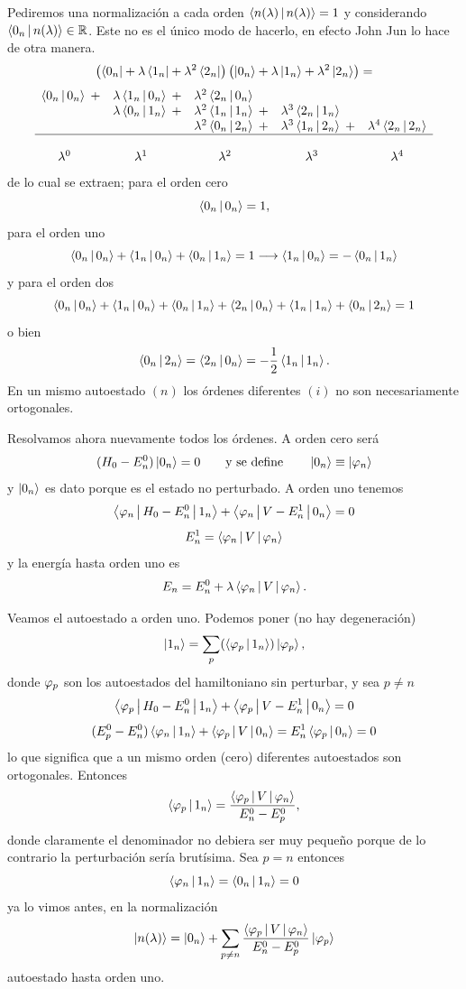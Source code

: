 \documentclass[10pt,oneside]{CBFT_book}
\begin{document}
Pediremos una normalización a cada orden $\Braket{n(\lambda)|n(\lambda)}=1$ y considerando 
$\Braket{0_n|n(\lambda)} \in \mathbb{R}$.
Este no es el único modo de hacerlo, en efecto John Jun lo hace de otra manera.
\[
	\left( \Bra{0_n} + \lambda\Bra{1_n} + \lambda^2\Bra{2_n} \right)
	\left( \Ket{0_n} + \lambda\Ket{1_n} + \lambda^2\Ket{2_n} \right) =
\]
\[
\begin{array}{ccccc}
 	\Braket{0_n|0_n}\; +& \lambda\Braket{1_n|0_n}\; +& \lambda^2 \Braket{2_n|0_n}\; \phantom{+}& \phantom{+}& \\
	\; & \lambda\Braket{0_n|1_n}\; +& \lambda^2\Braket{1_n|1_n}\; +& \lambda^3\Braket{2_n|1_n}\; \phantom{+}& \\
	\; & \; & \lambda^2\Braket{0_n|2_n}\; +& \lambda^3\Braket{1_n|2_n}\; +& \lambda^4\Braket{2_n|2_n}  \\
	\hline \\
	\lambda^0 \quad & \lambda^1 \quad & \lambda^2 \quad & \lambda^3 \quad & \lambda^4
\end{array}
\]
de lo cual se extraen; para el orden cero
\[
	\Braket{0_n|0_n} = 1,
\]
para el orden uno
\[
	\Braket{0_n|0_n} + \Braket{1_n|0_n} + \Braket{0_n|1_n} = 1 \longrightarrow 
	\Braket{1_n|0_n} = -\Braket{0_n|1_n}
\]
y para el orden dos
\[
	\Braket{0_n|0_n} + \Braket{1_n|0_n} + \Braket{0_n|1_n} + \Braket{2_n|0_n} + \Braket{1_n|1_n} +
	\Braket{0_n|2_n} = 1
\]
o bien
\[
	\Braket{0_n|2_n} = \Braket{2_n|0_n} = -\frac{1}{2} \Braket{1_n|1_n}.
\]
En un mismo autoestado $(n)$ los órdenes diferentes $(i)$ no son necesariamente ortogonales.

Resolvamos ahora nuevamente todos los órdenes.
A orden cero será 
\[
	(H_0 - E_n^0) \Ket{0_n} = 0 \qquad \text{y se define} \qquad \Ket{0_n} \equiv \Ket{\varphi_n} 
\]
y $\Ket{0_n}$ es dato porque es el estado no perturbado.
A orden uno tenemos 
\[
	\Braket{\varphi_n | H_0 - E_n^0 | 1_n } +  \Braket{\varphi_n | V - E_n^1 | 0_n } = 0
\]
\[
	E_n^1 = \Braket{\varphi_n |V| \varphi_n }
\]
y la energía hasta orden uno es 
\[
	E_n = E_n^0 + \lambda \Braket{\varphi_n |V| \varphi_n }.
\]

Veamos el autoestado a orden uno. Podemos poner (no hay degeneración)
\[
	\Ket{1_n} = \sum_p (\Braket{\varphi_p|1_n})\Ket{\varphi_p},
\]
donde $\varphi_p$ son los autoestados del hamiltoniano sin perturbar, y sea $p\neq n$
\[
	\Braket{\varphi_p | H_0 - E_n^0 | 1_n } +  \Braket{\varphi_p | V - E_n^1 | 0_n } = 0
\]
\[
	(E_p^0 - E_n^0)\Braket{\varphi_n | 1_n } +  \Braket{\varphi_p| V | 0_n } = 
	E_n^1 \Braket{\varphi_p | 0_n } = 0
\]
lo que significa que a un mismo orden (cero) diferentes autoestados son ortogonales.
Entonces
\[
	\Braket{\varphi_p|1_n} = \frac{\Braket{\varphi_p|V|\varphi_n}}{E_n^0 - E_p^0},
\]
donde claramente el denominador no debiera ser muy pequeño porque de lo contrario la
perturbación sería brutísima.
Sea $p=n$ entonces 
\[
	\Braket{\varphi_n|1_n} = \Braket{0_n|1_n} = 0 
\]
ya lo vimos antes, en la normalización
\[
	\Ket{n(\lambda)} = \Ket{0_n} + \sum_{p\neq n} 
	\frac{\Braket{\varphi_p|V|\varphi_n}}{E_n^0 - E_p^0} \Ket{\varphi_p}
\]
autoestado hasta orden uno.
\end{document}

